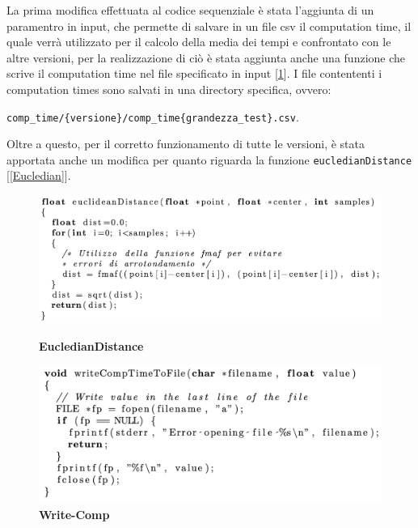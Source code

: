 \documentclass{article}
\begin{document}
  
  La prima modifica effettuata al codice sequenziale è stata l'aggiunta di un paramentro in input, che permette di salvare in un file csv il computation time, il quale
  verrà utilizzato per il calcolo della media dei tempi e confrontato con le altre versioni, per la realizzazione di ciò è stata aggiunta anche una funzione che scrive il computation
  time nel file specificato in input [\ref{Write}]. 
  I file contententi i computation times sono salvati in una directory specifica, 
  ovvero: 
  \begin{center}    
    \verb|comp_time/{versione}/comp_time{grandezza_test}.csv|.
  \end{center}
  Oltre a questo, per il corretto funzionamento di tutte le versioni, è stata 
  apportata anche un modifica per quanto riguarda la funzione \verb|eucledianDistance| [\ref{Eucledian}].
  \begin{figure}[ht]
    \hspace{-3cm} %
    \centering
    \begin{minipage}{0.4\textwidth}
        \centering
        \includegraphics[width=1.5\linewidth]{./Eucledian.png}
        \caption{\textbf{EucledianDistance}}
        \label{Eucledian}
    \end{minipage}
    \hspace{4cm} %
    \begin{minipage}{0.4\textwidth}
      \centering
      \includegraphics[width=1.4\linewidth]{./Write-Comp.png}
      \caption{\textbf{Write-Comp}}
      \label{Write}
    \end{minipage}
  \end{figure}
\end{document}
